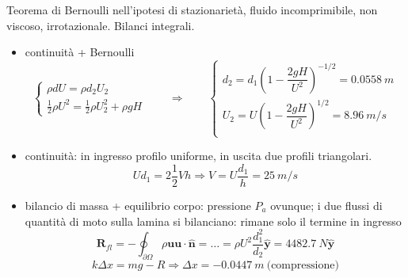 \sol

\partone
 Teorema di Bernoulli nell'ipotesi di stazionarietà, fluido incomprimibile, non viscoso, irrotazionale. Bilanci integrali.
 
\parttwo
\begin{itemize}
  \item continuità + Bernoulli
    \begin{equation}
      \begin{cases}
        \rho d U = \rho d_2 U_2 \\
        \frac{1}{2} \rho U^2 = \frac{1}{2} \rho U_2^2 + \rho g H
      \end{cases}
      \qquad \Rightarrow \qquad
      \begin{cases}
        d_2 = d_1 \left( 1 - \dfrac{2 g H}{U^2} \right)^{-1/2} = 0.0558 \ m \\
        U_2 = U \left( 1 - \dfrac{2 g H}{U^2} \right)^{1/2} = 8.96 \ m/s \\
      \end{cases}
    \end{equation}
  \item continuità: in ingresso profilo uniforme, in uscita due profili triangolari.
    \begin{equation}
      U d_1 = 2 \dfrac{1}{2} V h \Rightarrow V = U \dfrac{d_1}{h} = 25 \ m/s
    \end{equation}
  \item  bilancio di massa + equilibrio corpo: pressione $P_a$ ovunque; 
  i due flussi di quantità di moto sulla lamina si bilanciano: rimane 
  solo il termine in ingresso  
    \begin{equation}
    \bm{R}_{fl} = - \oint_{\partial \Omega} \rho \bm{u} \bm{u}
    \cdot \bm{\hat{n}}  =  \dots  = \rho U^2 \dfrac{d_1^2}{d_2} \bm{\hat{y}} = 4482.7 \ N \bm{\hat{y}}
    \end{equation}
    \begin{equation}
      k \Delta x = m g - R \Rightarrow \Delta x = - 0.0447 \ m \ \text{(compressione)}
    \end{equation}
\end{itemize}





